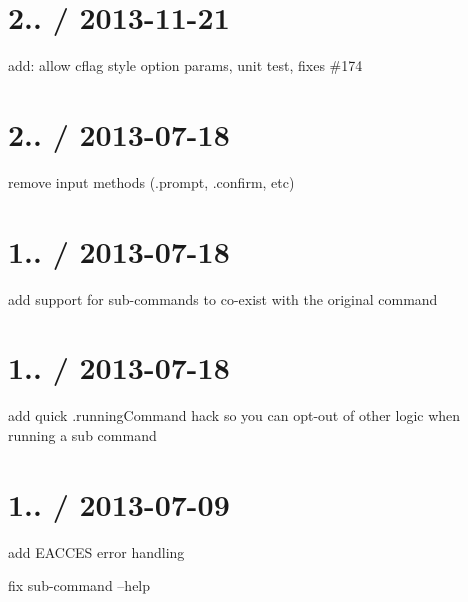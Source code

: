 \section*{2.. / 2013-\/11-\/21 }


\begin{DoxyItemize}
\item add\+: allow cflag style option params, unit test, fixes \#174
\end{DoxyItemize}

\section*{2.. / 2013-\/07-\/18 }


\begin{DoxyItemize}
\item remove input methods (.prompt, .confirm, etc)
\end{DoxyItemize}

\section*{1.. / 2013-\/07-\/18 }


\begin{DoxyItemize}
\item add support for sub-\/commands to co-\/exist with the original command
\end{DoxyItemize}

\section*{1.. / 2013-\/07-\/18 }


\begin{DoxyItemize}
\item add quick .running\+Command hack so you can opt-\/out of other logic when running a sub command
\end{DoxyItemize}

\section*{1.. / 2013-\/07-\/09 }


\begin{DoxyItemize}
\item add E\+A\+C\+C\+ES error handling
\item fix sub-\/command --help
\end{DoxyItemize}

